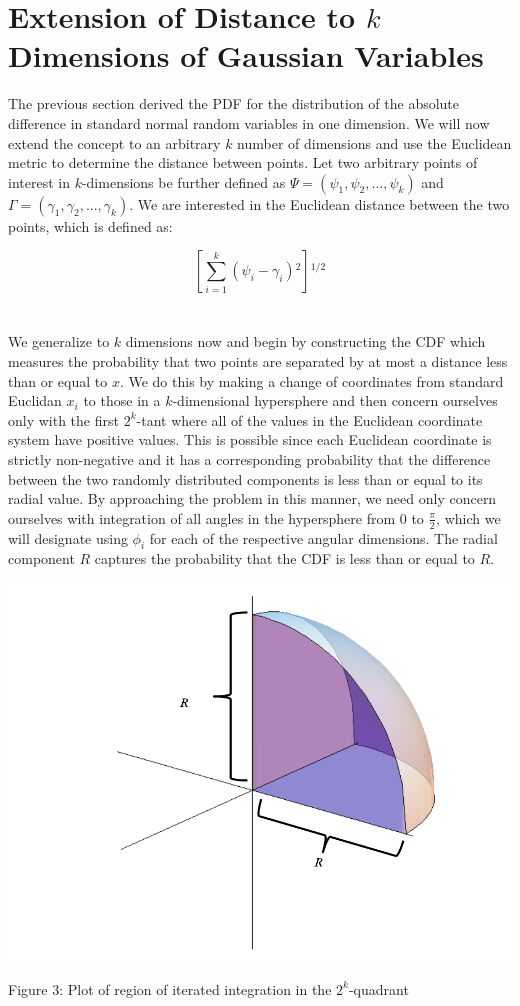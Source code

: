 \documentclass[11pt]{article} %
\begin{document}
\section{Extension of Distance to $k$ Dimensions of Gaussian Variables}
\indent The previous section derived the PDF for the distribution of the absolute difference in standard normal random variables in one dimension.  We will now extend the concept to an arbitrary $k$ number of dimensions and use the Euclidean metric to determine the distance between points.  Let two arbitrary points of interest in $k$-dimensions be further defined as $\Psi = \left(\psi_1 , \psi_2 , ...,\psi_k\right)$ and $\Gamma = \left(\gamma_1, \gamma_2, ...,\gamma_k\right)$.   We are interested in the Euclidean distance between the two points, which is defined as:

$$\left[\sum _{i=1}^k \left(\psi _i-\gamma _i\right){}^2\right]{}^{1/2}$$
\\ \\
\indent We generalize to $k$ dimensions now and begin by constructing the CDF which measures the probability that two points are separated by at most a distance less than or equal to $x$.  We do this by making a change of coordinates from standard Euclidan $x_i$ to those in a $k$-dimensional hypersphere and then concern ourselves only with the first $2^k$-tant where all of the values in the Euclidean coordinate system have positive values.  This is possible since each Euclidean coordinate is strictly non-negative and it has a corresponding probability that the difference between the two randomly distributed components is less than or equal to its radial value.  By approaching the problem in this manner, we need only concern ourselves with integration of all angles in the hypersphere from 0 to $\frac{\pi}{2}$, which we will designate using $\phi_i$ for each of the respective angular dimensions.  The radial component $R$ captures the probability that the CDF is less than or equal to $R$.  

\begin{center}
\includegraphics[scale=0.3]{Slide4.png}

Figure 3: Plot of region of iterated integration in the $2^k$-quadrant
\end{center}
\end{document}
